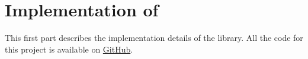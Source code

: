 \part{Implementation of \mfnet}

This first part describes the implementation details of the \mfnet library. All the code for this project is available on \href{https://www.github.com/marchfra/mfnet}{GitHub}.








